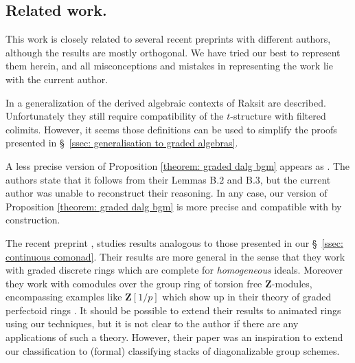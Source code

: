 \documentclass[10pt,reqno]{amsart}
\numberwithin{equation}{section}
\newcommand{\ZZ}{\mathbf{Z}}
\begin{document}
\subsection{Related work.}
This work is closely related to several recent preprints with different authors, although the results are mostly orthogonal. We have tried our best to represent them herein, and all misconceptions and mistakes in representing the work lie with the current author.

In \cite[Definition 5.1]{Antieau2025FiltrationsCohomologyI} a generalization of the derived algebraic contexts of Raksit are described. Unfortunately they still require compatibility of the $t$-structure with filtered colimits. However, it seems those definitions can be used to simplify the proofs presented in \S~\ref{ssec: generalisation to graded algebras}.

A less precise version of Proposition \ref{theorem: graded dalg bgm} appears as \cite[Remark B.5]{LahotiManam2025CohomologyRingStacks}. The authors state that it follows from their Lemmas B$.2$ and B$.3$, but the current author was unable to reconstruct their reasoning. In any case, our version of Proposition \ref{theorem: graded dalg bgm} is more precise and compatible with \cite{Moulinos2021GeometryOfFiltrations} by construction.

The recent preprint \cite{IshizukaYoshikawa2026DerivedGradedModules}, studies results analogous to those presented in our \S~\ref{ssec: continuous comonad}. Their results are more general in the sense that they work with graded discrete rings which are complete for \emph{homogeneous} ideals. Moreover they work with comodules over the group ring of torsion free $\ZZ$-modules, encompassing examples like $\ZZ[1/p]$ which show up in their theory of graded perfectoid rings \cite{IshizukaYoshikawa2025GradedPerfectoidRings}. It should be possible to extend their results to animated rings using our techniques, but it is not clear to the author if there are any applications of such a theory. However, their paper was an inspiration to extend our classification to (formal) classifying stacks of diagonalizable group schemes.
\end{document}
